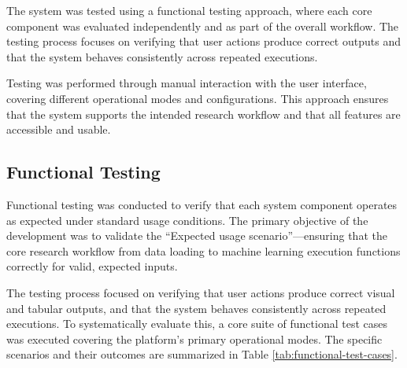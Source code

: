 The system was tested using a functional testing approach, where each core component was evaluated independently and as part of the overall workflow. The testing process focuses on verifying that user actions produce correct outputs and that the system behaves consistently across repeated executions.

\vspace{0.5em}
Testing was performed through manual interaction with the user interface, covering different operational modes and configurations. This approach ensures that the system supports the intended research workflow and that all features are accessible and usable.

\subsection{Functional Testing}
\label{sec:functional-testing}

Functional testing was conducted to verify that each system component operates as expected under standard usage conditions. The primary objective of the development was to validate the ``Expected usage scenario''---ensuring that the core research workflow from data loading to machine learning execution functions correctly for valid, expected inputs.

The testing process focused on verifying that user actions produce correct visual and tabular outputs, and that the system behaves consistently across repeated executions. To systematically evaluate this, a core suite of functional test cases was executed covering the platform's primary operational modes. The specific scenarios and their outcomes are summarized in Table \ref{tab:functional-test-cases}.

